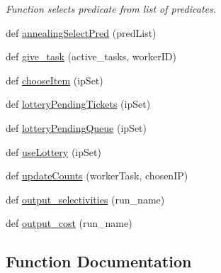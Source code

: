 \begin{DoxyCompactItemize}
\begin{DoxyCompactList}\small\item\em Function selects predicate from list of predicates. \end{DoxyCompactList}\item 
def \mbox{\hyperlink{namespacedynamicfilterapp_1_1views__helpers_a20d80f9f863820e348c0246b76e047c8}{annealing\+Select\+Pred}} (pred\+List)
\item 
def \mbox{\hyperlink{namespacedynamicfilterapp_1_1views__helpers_a57d38f302b6a3bd53a8e4c86c9581569}{give\+\_\+task}} (active\+\_\+tasks, worker\+ID)
\item 
def \mbox{\hyperlink{namespacedynamicfilterapp_1_1views__helpers_ad1a6f030776f2f8bcaae48a4dda40665}{choose\+Item}} (ip\+Set)
\item 
def \mbox{\hyperlink{namespacedynamicfilterapp_1_1views__helpers_a0738b44c5100686a1e192f6a479f4079}{lottery\+Pending\+Tickets}} (ip\+Set)
\item 
def \mbox{\hyperlink{namespacedynamicfilterapp_1_1views__helpers_a426ae35faab4f6770841e95e8bdce591}{lottery\+Pending\+Queue}} (ip\+Set)
\item 
def \mbox{\hyperlink{namespacedynamicfilterapp_1_1views__helpers_ac70553a13de6691cab15abdda021c913}{use\+Lottery}} (ip\+Set)
\item 
def \mbox{\hyperlink{namespacedynamicfilterapp_1_1views__helpers_a57d6ebd6f2f99cba59b82eded490891f}{update\+Counts}} (worker\+Task, chosen\+IP)
\item 
def \mbox{\hyperlink{namespacedynamicfilterapp_1_1views__helpers_a28b75553c43cd75d039443c9fc2b6408}{output\+\_\+selectivities}} (run\+\_\+name)
\item 
def \mbox{\hyperlink{namespacedynamicfilterapp_1_1views__helpers_adc56ec55dcde832ccd85dfade3328264}{output\+\_\+cost}} (run\+\_\+name)
\end{DoxyCompactItemize}


\subsection{Function Documentation}
\mbox{\label{namespacedynamicfilterapp_1_1views__helpers_ac0d019064d0a4dff3cd08f7ea4c4d560}} 
